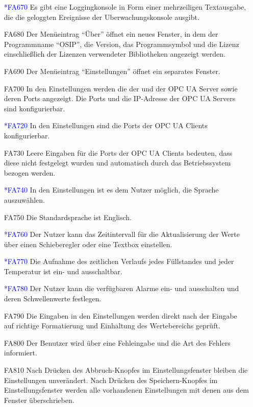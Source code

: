 \documentclass[parskip=full]{scrartcl}
\begin{document}
\begin{enumerate}
  \item[\textcolor{blue}{*FA670}] Es gibt eine Loggingkonsole in Form einer mehrzeiligen Textausgabe, die die geloggten Ereignisse der \gls{Uberwachungskonsole} ausgibt.
  \item[FA680] Der Menüeintrag "`Über"' öffnet ein neues Fenster, in dem der Programmname "`OSIP"', die Version, das Programmsymbol und die Lizenz einschließlich der Lizenzen verwendeter Bibliotheken angezeigt werden.
  \item[FA690] Der Menüeintrag "`Einstellungen"' öffnet ein separates Fenster.
  \item[FA700] In den Einstellungen werden die  der  und der \gls{OPC UA Server} sowie deren Ports angezeigt. Die Ports und die IP-Adresse
  der \glspl{OPC UA Server} sind konfigurierbar.
  \item[\textcolor{blue}{*FA720}] In den Einstellungen sind die Ports der \glspl{OPC UA Client} konfigurierbar.
  \item[FA730] Leere Eingaben für die Ports der \glspl{OPC UA Client} bedeuten, dass diese nicht festgelegt wurden und automatisch durch das Betriebssystem bezogen werden.
  \item[\textcolor{blue}{*FA740}] In den Einstellungen ist es dem Nutzer möglich, die Sprache auszuwählen.
  \item[FA750] Die Standardsprache ist Englisch.
  \item[\textcolor{blue}{*FA760}] Der Nutzer kann das Zeitintervall für die Aktualisierung der Werte über einen Schieberegler oder eine Textbox einstellen.
  \item[\textcolor{blue}{*FA770}] Die Aufnahme des zeitlichen Verlaufs jedes Füllstandes und jeder Temperatur ist ein- und ausschaltbar.
  \item[\textcolor{blue}{*FA780}] Der Nutzer kann die verfügbaren Alarme ein- und ausschalten und deren Schwellenwerte festlegen.
  \item[FA790] Die Eingaben in den Einstellungen werden direkt nach der Eingabe auf richtige Formatierung und Einhaltung des Wertebereichs gepr\"uft.
  \item[FA800] Der Benutzer wird über eine Fehleingabe und die Art des Fehlers informiert.
  \item[FA810] Nach Drücken des Abbruch-Knopfes im Einstellungsfenster bleiben die Einstellungen unverändert. Nach Drücken des Speichern-Knopfes im Einstellungsfenster werden alle vorhandenen
  Einstellungen mit denen aus dem Fenster überschrieben.

\end{enumerate}
\end{document}
